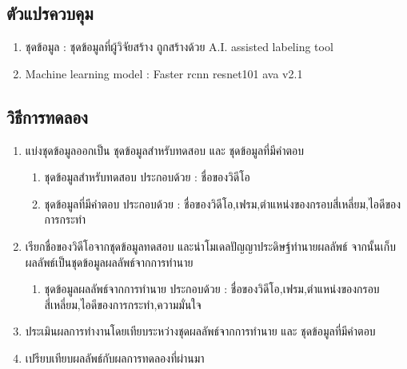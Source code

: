 \subsection*{ตัวแปรควบคุม}
	\begin{enumerate}
		\item ชุดข้อมูล : ชุดข้อมูลที่ผู้วิจัยสร้าง ถูกสร้างด้วย A.I. assisted labeling tool
		\item Machine learning model : Faster rcnn resnet101 ava v2.1
	\end{enumerate}
\subsection*{วิธีการทดลอง}
	\begin{enumerate}
		\item แบ่งชุดข้อมูลออกเป็น ชุดข้อมูลสำหรับทดสอบ และ ชุดข้อมูลที่มีคำตอบ
			\begin{enumerate}
				\item ชุดข้อมูลสำหรับทดสอบ ประกอบด้วย : ชื่อของวิดีโอ
				\item ชุดข้อมูลที่มีคำตอบ ประกอบด้วย : ชื่อของวิดีโอ,เฟรม,ตำแหน่งของกรอบสี่เหลี่ยม,ไอดีของการกระทำ
			\end{enumerate}
		\item เรียกชื่อของวิดีโอจากชุดข้อมูลทดสอบ และนำโมเดลปัญญาประดิษฐ์ทำนายผลลัพธ์ จากนั้นเก็บผลลัพธ์เป็นชุดข้อมูลผลลัพธ์จากการทำนาย
			\begin{enumerate}
				\item ชุดข้อมูลผลลัพธ์จากการทำนาย ประกอบด้วย : ชื่อของวิดีโอ,เฟรม,ตำแหน่งของกรอบสี่เหลี่ยม,ไอดีของการกระทำ,ความมั่นใจ
			\end{enumerate}
		\item ประเมินผลการทำงานโดยเทียบระหว่างชุดผลลัพธ์จากการทำนาย และ ชุดข้อมูลที่มีคำตอบ	
		\item เปรียบเทียบผลลัพธ์กับผลการทดลองที่ผ่านมา
\end{enumerate}





